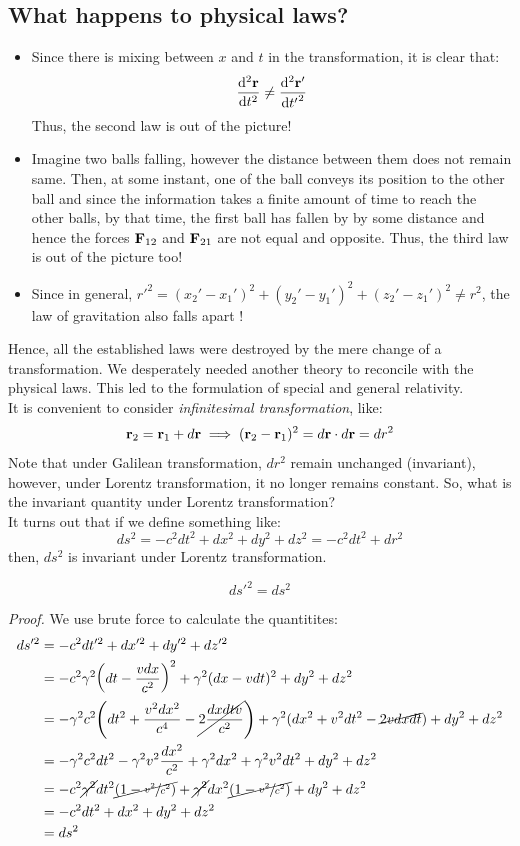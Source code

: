    \subsection{What happens to physical laws?}
   \begin{itemize}
    \item Since there is mixing between $x$ and $t$ in the transformation, it is clear that: 
    $$\dv[2]{\vb{r}}{t}\neq \dv[2]{{\vb{r}'}}{{t'}}$$
    Thus, the second law is out of the picture! 
    \item Imagine two balls falling, however the distance between them does not remain same. Then, at some instant, one of the ball conveys its position to the other ball and since the information takes a finite amount of time to reach the other balls, by that time, the first ball has fallen by by some distance and hence the forces $\vb{F}_{12}$ and $\vb{F}_{21}$ are not equal and opposite.
     Thus, the third law is out of the picture too! 
     \item Since in general, $r'^2 = (x_2'-x_1')^2+(y_2'-y_1')^2+(z_2'-z_1')^2 \neq r^2$, the law of gravitation also falls apart !
   \end{itemize}
   Hence, all the established laws were destroyed by the mere change of a transformation. We desperately needed another theory to reconcile with the physical laws. This led to the formulation of special and general relativity. \\[0.2cm]
   It is convenient to consider \textit{infinitesimal transformation}, like:
   $$\vb{r}_2 = \vb{r}_1 + d\vb{r}\implies (\vb{r}_2-\vb{r}_1)^2 = d\vb{r}\cdot d\vb{r} = dr^2$$
   Note that under Galilean transformation, $dr^2$ remain unchanged (invariant), however, under Lorentz transformation, it no longer remains constant. So, what is the invariant quantity under Lorentz transformation? \\[0.2cm]
   It turns out that if we define something like: 
   $$ds^2 = -c^2dt^2 +dx^2+dy^2+dz^2 = -c^2dt^2 +dr^2$$
   then, $ds^2$ is invariant under Lorentz transformation. 
   \begin{lemma}[Invariance of $ds$]
    $$ds'^2 = ds^2$$
   \end{lemma}
   \textit{Proof.} We use brute force to calculate the quantitites:
   \begin{align*}
    ds'^2 &= -c^2dt'^2 + dx'^2 +dy'^2 +dz'^2\\
    &=-c^2 \gamma^2\qty(dt-\frac{vdx}{c^2})^2 + \gamma^2(dx-vdt)^2 + dy^2+dz^2\\
    &=-\gamma^2c^2\qty(dt^2 + \frac{v^2dx^2}{c^4} -\cancel{ 2\frac{dxdtv}{c^2}}) + \gamma^2(dx^2+v^2dt^2-\cancel{2vdxdt})+dy^2+dz^2\\
    &= -\gamma^2c^2 dt^2  -\gamma^2v^2\frac{dx^2}{c^2}+\gamma^2dx^2+\gamma^2v^2dt^2+dy^2+dz^2\\
    &=-c^2\cancel{\gamma^2} dt^2\cancel{(1-\sfrac{v^2}{c^2})}+\cancel{\gamma^2}dx^2\cancel{(1-\sfrac{v^2}{c^2})}+dy^2+dz^2\\
    &=-c^2dt^2+dx^2+dy^2+dz^2\\
    &=ds^2
   \end{align*}
